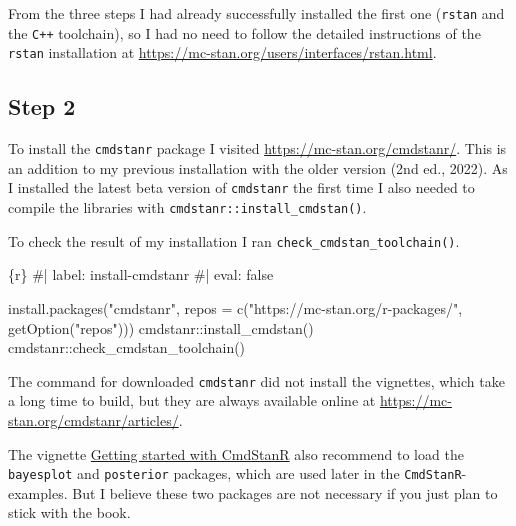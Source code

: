 \documentclass[
  letterpaper,
  DIV=11,
  numbers=noendperiod]{scrreprt}
\newenvironment{Shaded}{\begin{snugshade}}{\end{snugshade}}
\newcommand{\AttributeTok}[1]{\textcolor[rgb]{0.40,0.45,0.13}{#1}}
\newcommand{\CommentTok}[1]{\textcolor[rgb]{0.37,0.37,0.37}{#1}}
\newcommand{\FunctionTok}[1]{\textcolor[rgb]{0.28,0.35,0.67}{#1}}
\newcommand{\InformationTok}[1]{\textcolor[rgb]{0.37,0.37,0.37}{#1}}
\newcommand{\NormalTok}[1]{\textcolor[rgb]{0.00,0.23,0.31}{#1}}
\newcommand{\SpecialCharTok}[1]{\textcolor[rgb]{0.37,0.37,0.37}{#1}}
\newcommand{\StringTok}[1]{\textcolor[rgb]{0.13,0.47,0.30}{#1}}
\begin{document}
From the three steps I had already successfully installed the first one
(\texttt{rstan} and the \texttt{C++} toolchain), so I had no need to
follow the detailed instructions of the \texttt{rstan} installation at
\url{https://mc-stan.org/users/interfaces/rstan.html}.

\hypertarget{step-2}{%
\subsection*{Step 2}\label{step-2}}

To install the \texttt{cmdstanr} package I visited
\url{https://mc-stan.org/cmdstanr/}. This is an addition to my previous
installation with the older version (2nd ed., 2022). As I installed the
latest beta version of \texttt{cmdstanr} the first time I also needed to
compile the libraries with \texttt{cmdstanr::install\_cmdstan()}.

To check the result of my installation I ran
\texttt{check\_cmdstan\_toolchain()}.

\begin{Shaded}
\begin{Highlighting}[]
\InformationTok{\textasciigrave{}\textasciigrave{}\textasciigrave{}\{r\}}
\CommentTok{\#| label: install{-}cmdstanr}
\CommentTok{\#| eval: false}

\FunctionTok{install.packages}\NormalTok{(}\StringTok{"cmdstanr"}\NormalTok{, }\AttributeTok{repos =} \FunctionTok{c}\NormalTok{(}\StringTok{"https://mc{-}stan.org/r{-}packages/"}\NormalTok{, }\FunctionTok{getOption}\NormalTok{(}\StringTok{"repos"}\NormalTok{)))}
\NormalTok{cmdstanr}\SpecialCharTok{::}\FunctionTok{install\_cmdstan}\NormalTok{()}
\NormalTok{cmdstanr}\SpecialCharTok{::}\FunctionTok{check\_cmdstan\_toolchain}\NormalTok{()}

\InformationTok{\textasciigrave{}\textasciigrave{}\textasciigrave{}}
\end{Highlighting}
\end{Shaded}

The command for downloaded \texttt{cmdstanr} did not install the
vignettes, which take a long time to build, but they are always
available online at \url{https://mc-stan.org/cmdstanr/articles/}.

The vignette
\href{https://mc-stan.org/cmdstanr/articles/cmdstanr.html}{Getting
started with CmdStanR} also recommend to load the \texttt{bayesplot} and
\texttt{posterior} packages, which are used later in the
\texttt{CmdStanR}-examples. But I believe these two packages are not
necessary if you just plan to stick with the book.
\end{document}
